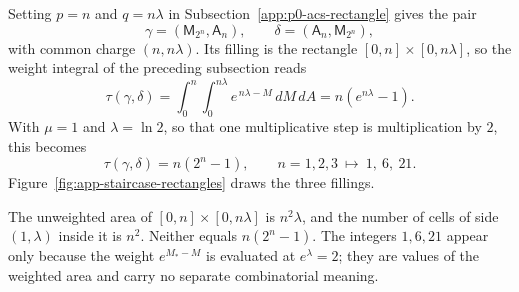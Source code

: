 Setting \(p=n\) and \(q=n\lambda\) in
Subsection~\ref{app:p0-acs-rectangle} gives the pair
\[
    \gamma=(\mathsf M_{2^n},\mathsf A_n),
    \qquad
    \delta=(\mathsf A_n,\mathsf M_{2^n}),
\]
with common charge \((n,n\lambda)\).  Its filling is the rectangle
\([0,n]\times[0,n\lambda]\), so the weight integral of the preceding
subsection reads
\begin{equation}
    \tau(\gamma,\delta)
      =\int_0^n\!\!\int_0^{n\lambda} e^{\,n\lambda-M}\,dM\,dA
      =n\left(e^{n\lambda}-1\right).
    \label{eq:app-staircase-defect}
\end{equation}
With \(\mu=1\) and \(\lambda=\ln2\), so that one multiplicative step is
multiplication by \(2\), this becomes
\[
    \tau(\gamma,\delta)=n\left(2^{n}-1\right),
    \qquad
    n=1,2,3\ \longmapsto\ 1,\ 6,\ 21 .
\]
Figure~\ref{fig:app-staircase-rectangles} draws the three fillings.

\begin{remark}
\label{rem:app-staircase-not-cells}
The unweighted area of \([0,n]\times[0,n\lambda]\) is \(n^{2}\lambda\), and
the number of cells of side \((1,\lambda)\) inside it is \(n^{2}\).  Neither
equals \(n(2^{n}-1)\).  The integers \(1,6,21\) appear only because the weight
\(e^{M_{*}-M}\) is evaluated at \(e^{\lambda}=2\); they are values of the
weighted area and carry no separate combinatorial meaning.
\end{remark}

